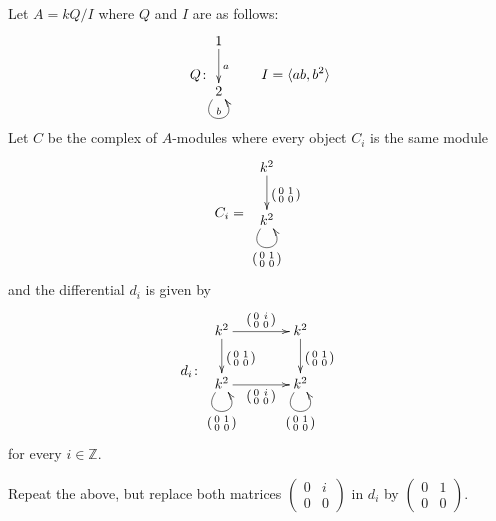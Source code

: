 \documentclass[a4paper]{amsart}
\newcommand{\Z}{\mathbb{Z}}
\begin{document}
\begin{Exercise}[title={Chain complexes}]
\Question Let $A = kQ/I$ where $Q$ and $I$ are as follows:
\[
Q\colon
\vcenter{\xymatrix{
1 \ar[d]^a \\
2 \ar@(dl,dr)^b
}}
\qquad
I = \langle ab, b^2 \rangle
\]
Let $C$ be the complex of $A$-modules where every object $C_i$ is the
same module
\[
C_i =
\vcenter{\xymatrix{
k^2 \ar[d]^{\left( \begin{smallmatrix} 0&1 \\ 0&0 \end{smallmatrix} \right)} \\
k^2 \ar@(dl,dr)_{\left( \begin{smallmatrix} 0&1 \\ 0&0 \end{smallmatrix} \right)}
}}
\]
and the differential $d_i$ is given by
\[
d_i \colon
\vcenter{\xymatrix@C=4em{
k^2 \ar[d]^{\left( \begin{smallmatrix} 0&1 \\ 0&0 \end{smallmatrix} \right)}
    \ar[r]^{\left( \begin{smallmatrix} 0&i \\ 0&0 \end{smallmatrix} \right)} &
k^2 \ar[d]^{\left( \begin{smallmatrix} 0&1 \\ 0&0 \end{smallmatrix} \right)} \\
k^2 \ar@(dl,dr)_{\left( \begin{smallmatrix} 0&1 \\ 0&0 \end{smallmatrix} \right)}
    \ar[r]_{\left( \begin{smallmatrix} 0&i \\ 0&0 \end{smallmatrix} \right)} &
k^2 \ar@(dl,dr)_{\left( \begin{smallmatrix} 0&1 \\ 0&0 \end{smallmatrix} \right)}
}}
\]
for every $i \in \Z$.

\Question Repeat the above, but replace both matrices
$\left( \begin{smallmatrix} 0&i \\ 0&0 \end{smallmatrix} \right)$
in $d_i$ by
$\left( \begin{smallmatrix} 0&1 \\ 0&0 \end{smallmatrix} \right)$.
\end{Exercise}

\end{document}
